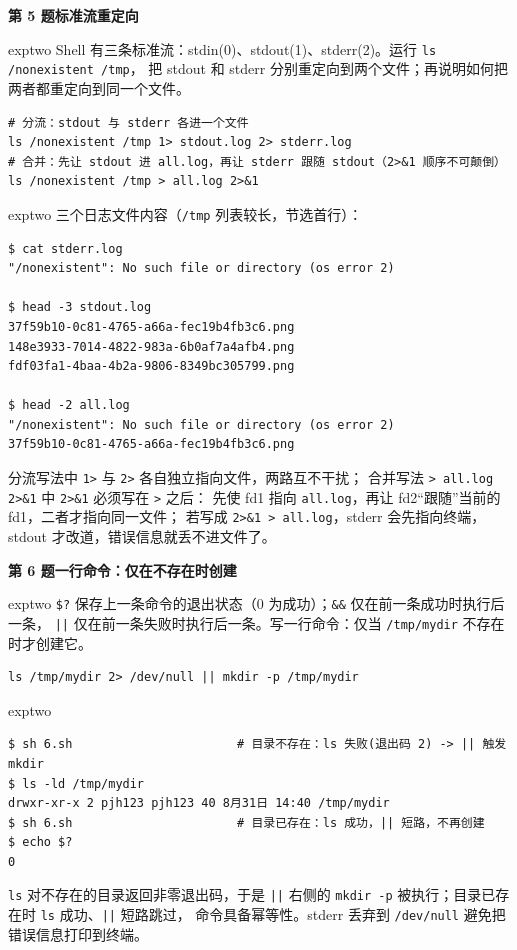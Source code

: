 \documentclass[11pt,a4paper,fontset=none]{ctexart}
\newcommand{\hwbanner}[3]{%
  \par\vspace{1.1em}
  \begin{tcolorbox}[enhanced, colback=#1!8, colframe=#1!75!black,
    boxrule=0.8pt, arc=2pt, left=7pt, right=7pt, top=4pt, bottom=4pt,
    before skip=1.1em]
    {\bfseries\color{#1!75!black}#2\qquad #3}
  \end{tcolorbox}
  \par\vspace{0.1em}\noindent\ignorespaces
}
\newcommand{\sublabel}[2]{%
  \par\vspace{0.8em}\noindent{\bfseries\color{#1!75!black}#2}\par\nobreak\vspace{0.25em}\noindent\ignorespaces
}
\begin{document}
\hwbanner{exptwo}{第 5 题}{标准流重定向}
\begin{reqbox}{exptwo}
  Shell 有三条标准流：stdin(0)、stdout(1)、stderr(2)。运行 \texttt{ls /nonexistent /tmp}，
  把 stdout 和 stderr 分别重定向到两个文件；再说明如何把两者都重定向到同一个文件。
\end{reqbox}
\sublabel{exptwo}{\faTerminal\ 操作（\texttt{5/rd2.sh}、\texttt{5/rd1.sh}）}
\begin{lstlisting}[style=shell]
# 分流：stdout 与 stderr 各进一个文件
ls /nonexistent /tmp 1> stdout.log 2> stderr.log
# 合并：先让 stdout 进 all.log，再让 stderr 跟随 stdout（2>&1 顺序不可颠倒）
ls /nonexistent /tmp > all.log 2>&1
\end{lstlisting}
\begin{resbox}{exptwo}
三个日志文件内容（\texttt{/tmp} 列表较长，节选首行）：
\begin{lstlisting}[style=output]
$ cat stderr.log
"/nonexistent": No such file or directory (os error 2)

$ head -3 stdout.log
37f59b10-0c81-4765-a66a-fec19b4fb3c6.png
148e3933-7014-4822-983a-6b0af7a4afb4.png
fdf03fa1-4baa-4b2a-9806-8349bc305799.png

$ head -2 all.log
"/nonexistent": No such file or directory (os error 2)
37f59b10-0c81-4765-a66a-fec19b4fb3c6.png
\end{lstlisting}
分流写法中 \texttt{1>} 与 \texttt{2>} 各自独立指向文件，两路互不干扰；
合并写法 \texttt{> all.log 2>\&1} 中 \texttt{2>\&1} 必须写在 \texttt{>} 之后：
先使 fd1 指向 \texttt{all.log}，再让 fd2“跟随”当前的 fd1，二者才指向同一文件；
若写成 \texttt{2>\&1 > all.log}，stderr 会先指向终端，stdout 才改道，错误信息就丢不进文件了。
\end{resbox}

\hwbanner{exptwo}{第 6 题}{一行命令：仅在不存在时创建}
\begin{reqbox}{exptwo}
  \texttt{\$?} 保存上一条命令的退出状态（0 为成功）；\texttt{\&\&} 仅在前一条成功时执行后一条，
  \texttt{||} 仅在前一条失败时执行后一条。写一行命令：仅当 \texttt{/tmp/mydir} 不存在时才创建它。
\end{reqbox}
\sublabel{exptwo}{\faCode\ 解答（\texttt{6.sh}）}
\begin{lstlisting}[style=shell]
ls /tmp/mydir 2> /dev/null || mkdir -p /tmp/mydir
\end{lstlisting}
\begin{resbox}{exptwo}
\begin{lstlisting}[style=output]
$ sh 6.sh                       # 目录不存在：ls 失败(退出码 2) -> || 触发 mkdir
$ ls -ld /tmp/mydir
drwxr-xr-x 2 pjh123 pjh123 40 8月31日 14:40 /tmp/mydir
$ sh 6.sh                       # 目录已存在：ls 成功，|| 短路，不再创建
$ echo $?
0
\end{lstlisting}
\texttt{ls} 对不存在的目录返回非零退出码，于是 \texttt{||} 右侧的
\texttt{mkdir -p} 被执行；目录已存在时 \texttt{ls} 成功、\texttt{||} 短路跳过，
命令具备幂等性。stderr 丢弃到 \texttt{/dev/null} 避免把错误信息打印到终端。
\end{resbox}
\end{document}
